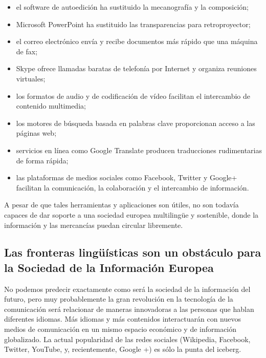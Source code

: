 \begin{multicols}{2}
\begin{itemize}
  \item el software de autoedición ha sustituido la mecanografía y la composición;
  \item Microsoft PowerPoint ha sustituido las transparencias para retroproyector;
  \item el correo electrónico envía y recibe documentos más rápido que una máquina de fax;
  \item Skype ofrece llamadas baratas de telefonía por Internet y organiza reuniones virtuales;
  \item los formatos de audio y de codificación de vídeo facilitan el intercambio de contenido multimedia;
  \item los motores de búsqueda basada en palabras clave proporcionan acceso a las páginas web;
  \item servicios en línea como Google Translate producen traducciones rudimentarias de forma rápida;
  \item las plataformas de medios sociales como Facebook, Twitter y Google+ facilitan la comunicación, la colaboración y el intercambio de información.
\end{itemize}

  A pesar de que tales herramientas y aplicaciones son útiles, no son todavía capaces de dar soporte a una sociedad europea multilingüe y sostenible, donde la información y las mercancías puedan circular libremente.

\subsection{Las fronteras lingüísticas son un obstáculo para la Sociedad de la Información Europea}
  
  No podemos predecir exactamente como será la sociedad de la información del futuro, pero muy probablemente la gran revolución en la tecnología de la comunicación será relacionar de maneras innovadoras a las personas que hablan diferentes idiomas. Más idiomas y más contenidos interactuarán con nuevos  medios de comunicación en un mismo espacio económico y de información globalizado. La actual popularidad de las redes sociales (Wikipedia, Facebook, Twitter, YouTube, y, recientemente, Google +) es sólo la punta del iceberg.



\end{multicols}
